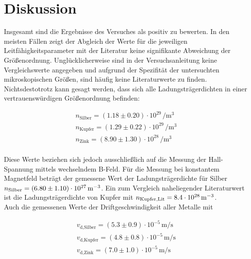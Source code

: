 %

%
\section{Diskussion}
\label{sec:Diskussion}

Insgesamt sind die Ergebnisse des Versuches als positiv zu bewerten. In den meisten Fällen zeigt der Abgleich der 
Werte für die jeweiligen Leitfähigkeitsparameter mit der Literatur keine signifikante Abweichung der Größenordnung.
Unglücklicherweise sind in der Versuchsanleitung keine Vergleichswerte angegeben und aufgrund der Spezifität der 
untersuchten mikroskopischen Größen, sind häufig keine Literaturwerte zu finden.\\

\noindent Nichtsdestotrotz kann gesagt werden, dass sich alle Ladungsträgerdichten in einer vertrauenswürdigen Größenordnung befinden:

\begin{align*}
    n_\text{Silber} = \left(1.18 \pm 0.20\right)\cdot{}10^{29}\,\unit{\per\cubic\meter}\\
    n_\text{Kupfer} = \left(1.29 \pm 0.22\right)\cdot{}10^{29}\,\unit{\per\cubic\meter}\\
    n_\text{Zink}   = \left(8.90 \pm 1.30\right)\cdot{}10^{28}\,\unit{\per\cubic\meter}\\
\end{align*}

\noindent Diese Werte beziehen sich jedoch ausschließlich auf die Messung der Hall-Spannung mittels wechselndem B-Feld.
Für die Messung bei konstantem Magnetfeld beträgt der gemessene Wert der Ladungsträgerdichte für Silber 
$n_\text{Silber} = \left(6.80 \pm 1.10\right)\cdot{}10^{27}\,\unit[per-mode=reciprocal]{\per\cubic\meter}$. Ein zum Vergleich naheliegender
Literaturwert ist die Ladungsträgerdichte von Kupfer mit $n_\text{Kupfer,Lit} = 8.4\cdot{}10^{28}\,\unit[per-mode=reciprocal]{
\per\cubic\meter}$\cite{leitfaehigkeiten}.\\

\noindent Auch die gemessenen Werte der Driftgeschwindigkeit aller Metalle mit 

\begin{align*}
    v_\text{d,Silber} = \left(5.3 \pm 0.9\right)\cdot{}10^{-5}\,\unit{\meter\per\second}\\
    v_\text{d,Kupfer} = \left(4.8 \pm 0.8\right)\cdot{}10^{-5}\,\unit{\meter\per\second}\\
    v_\text{d,Zink}   = \left(7.0 \pm 1.0\right)\cdot{}10^{-5}\,\unit{\meter\per\second}\\
\end{align*}

